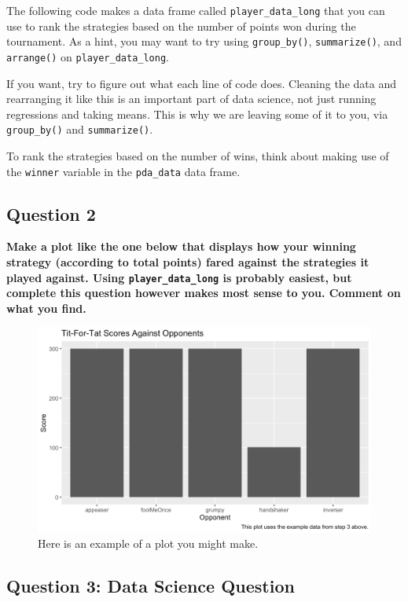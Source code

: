 \documentclass[
]{article}
\begin{document}
The following code makes a data frame called \texttt{player\_data\_long}
that you can use to rank the strategies based on the number of points
won during the tournament. As a hint, you may want to try using
\texttt{group\_by()}, \texttt{summarize()}, and \texttt{arrange()} on
\texttt{player\_data\_long}.

If you want, try to figure out what each line of code does. Cleaning the
data and rearranging it like this is an important part of data science,
not just running regressions and taking means. This is why we are
leaving some of it to you, via \texttt{group\_by()} and
\texttt{summarize()}.

To rank the strategies based on the number of wins, think about making
use of the \texttt{winner} variable in the \texttt{pda\_data} data
frame.

\hypertarget{question-2}{%
\subsection{Question 2}\label{question-2}}

\textbf{Make a plot like the one below that displays how your winning
strategy (according to total points) fared against the strategies it
played against. Using \texttt{player\_data\_long} is probably easiest,
but complete this question however makes most sense to you. Comment on
what you find.}

\begin{figure}
\centering
\includegraphics{./rmd_photos/question2.png}
\caption{Here is an example of a plot you might make.}
\end{figure}

\hypertarget{question-3-data-science-question}{%
\subsection{Question 3: Data Science
Question}\label{question-3-data-science-question}}
\end{document}
